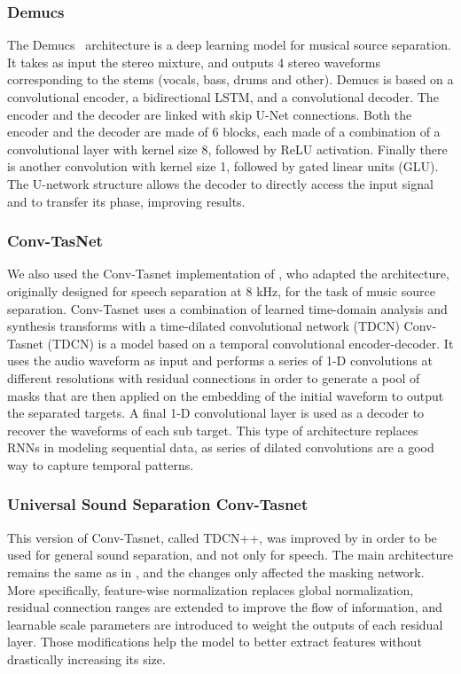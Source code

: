\documentclass{article}
\begin{document}
			\subsubsection{Demucs}
			The Demucs~\cite{demucs} architecture is a deep learning model for musical source separation. It takes as input the stereo mixture, and outputs 4 stereo waveforms corresponding to the stems (vocals, bass, drums and other). Demucs is based on a convolutional encoder, a bidirectional LSTM, and a convolutional decoder. The encoder and the decoder are linked with skip U-Net connections. Both the encoder and the decoder are made of 6 blocks, each made of a combination of a convolutional layer with kernel size 8, followed by ReLU activation. Finally there is another convolution with kernel size 1, followed by gated linear units (GLU). The U-network structure allows the decoder to directly access the input signal and to transfer its phase, improving results.	
			
			\subsubsection{Conv-TasNet}
			We also used the Conv-Tasnet\cite{tdcn} implementation of \cite{demucs}, who adapted the architecture, originally designed for speech separation at 8 kHz, for the task of music source separation. 
			Conv-Tasnet uses  a combination of learned time-domain analysis and synthesis transforms with a time-dilated convolutional network (TDCN)
			Conv-Tasnet (TDCN) is a model based on a temporal convolutional encoder-decoder. It uses the audio waveform as input and performs a series of 1-D convolutions at different resolutions with residual connections in order to generate a pool of masks that are then applied on the embedding of the initial waveform to output the separated targets. A final 1-D convolutional layer is used as a decoder to recover the waveforms of each sub target. This type of architecture replaces RNNs in modeling sequential data, as series of dilated convolutions are a good way to capture temporal patterns.		
			
			\subsubsection{Universal Sound Separation Conv-Tasnet}
			This version of Conv-Tasnet, called TDCN++, was improved by \cite{tdcnpp} in order to be used for general sound separation, and not only for speech. The main architecture remains the same as in \cite{tdcn}, and the changes only affected the masking network. More specifically, feature-wise normalization replaces global normalization, residual connection ranges are extended to improve the flow of information, and learnable scale parameters are introduced to weight the outputs of each residual layer. Those modifications help the model to better extract features without drastically increasing its size.
			
\end{document}
